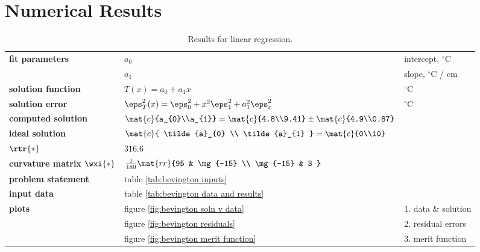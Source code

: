 \section{Numerical Results}  %

  \begin{table}[t]  %
    \caption{Results for linear regression.}
    \begin{center}
      \begin{tabular}{lll}
        \bf{fit parameters} & $a_{0}$ & intercept, $^{\circ}$C \\
                            & $a_{1}$ & slope, $^{\circ}$C / cm \\
        \bf{solution function} & $T(x) = a_{0} + a_{1} x$ & $^{\circ}$C \\
        \bf{solution error} & $\eps_{T}^{2}(x) = \eps_{0}^{2} + x^{2} \eps_{1}^{2} + a_{1}^{2} \eps_{x}^{2} $ &$^{\circ}$C \\
        \bf{computed solution} & $\mat{c}{a_{0}\\a_{1}} = \mat{c}{4.8\\9.41} \pm \mat{c}{4.9\\0.87}$ \\
        \bf{ideal solution} & $\mat{c}{ \tilde{a}_{0} \\ \tilde{a}_{1} } = \mat{c}{0\\10}$ \\
        \bf{$\rtr{*}$} & $316.6$ \\
        \bf{curvature matrix $\wxi{*}$} & $\frac{1}{180}\mat{rr}{95 & \mg{-15} \\ \mg{-15} & 3 }$\\[5pt]
        \bf{problem statement} & table \ref{tab:bevington inputs} \\
        \bf{input data}        & table \ref{tab:bevington data and results} \\
        \bf{plots}          & figure \ref{fig:bevington soln v data}    & 1. data \& solution \\
                            & figure \ref{fig:bevington residuals}      & 2. residual errors \\
                            & figure \ref{fig:bevington merit function} & 3. merit function \\
      \end{tabular}
    \end{center}
  \label{tab:bevington solution}
  \end{table}%

